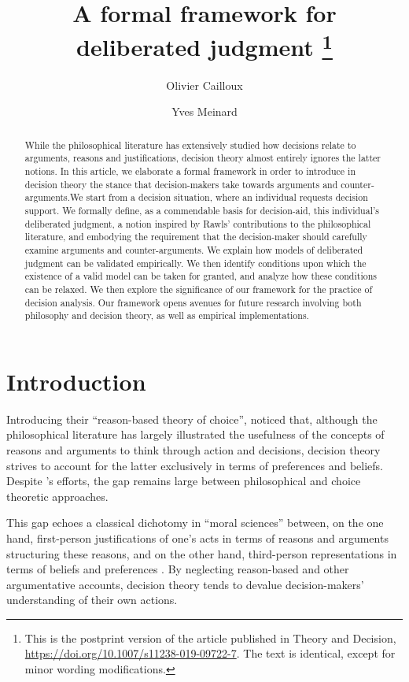\documentclass[version=3.21, pagesize, twoside=off, bibliography=totoc, DIV=calc, fontsize=12pt, a4paper]{scrartcl}
\title{A formal framework for deliberated judgment%
	\thanks{This is the postprint version of the article published in Theory and Decision, \url{https://doi.org/10.1007/s11238-019-09722-7}. 	The text is identical, except for minor wording modifications.}
}
\author{Olivier Cailloux}
\author{Yves Meinard}
\affil{Université Paris-Dauphine, PSL Research University, CNRS, LAMSADE, 75016 PARIS, FRANCE\\
	\href{mailto:olivier.cailloux@dauphine.fr}{olivier.cailloux@dauphine.fr}
}
\begin{document}
\maketitle

\begin{abstract}
While the philosophical literature has extensively studied how decisions relate to arguments, reasons and justifications, decision theory almost entirely ignores the latter notions.
In this article, we elaborate a formal framework in order to introduce in decision theory the stance that decision-makers take towards arguments and counter-arguments.We start from a decision situation, where an individual requests decision support. We formally define, as a commendable basis for decision-aid, this individual’s deliberated judgment, a notion inspired by Rawls' contributions to the philosophical literature, and embodying the requirement that the decision-maker should carefully examine arguments and counter-arguments.  
We explain how models of deliberated judgment can be validated empirically.
We then identify conditions upon which the existence of a valid model can be taken for granted, and analyze how these conditions can be relaxed.
We then explore the significance of our framework for the practice of decision analysis.
Our framework opens avenues for future research involving both philosophy and decision theory, as well as empirical implementations. 
\end{abstract}

\section{Introduction}
\label{sec:intro}

Introducing their “reason-based theory of choice”, \citet{dietrich_reason-based_2013} noticed that, although the philosophical literature has largely illustrated the usefulness of the concepts of reasons and arguments to think through action and decisions, decision theory strives to account for the latter exclusively in terms of preferences and beliefs. Despite \citeauthor{dietrich_reason-based_2013}’s \citeyearpar{dietrich_reason-based_2013, dietrich_reason-based_2016} efforts, the gap remains large between philosophical and choice theoretic approaches.

This gap echoes a classical dichotomy in “moral sciences” between, on the one hand, first-person justifications of one's acts in terms of reasons and arguments structuring these reasons, and on the other hand, third-person representations in terms of beliefs and preferences \citep{hausman_preference_2011}. By neglecting reason-based and other argumentative accounts, decision theory tends to devalue decision-makers' understanding of their own actions.
\end{document}
